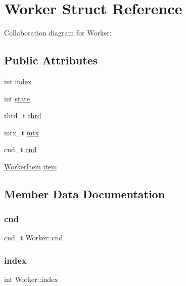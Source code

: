 \hypertarget{structWorker}{}\section{Worker Struct Reference}
\label{structWorker}


Collaboration diagram for Worker\+:
\subsection*{Public Attributes}
\begin{DoxyCompactItemize}
\item 
int \hyperlink{structWorker_a907158fe4322e1a0e2edeb426d85e757}{index}
\item 
int \hyperlink{structWorker_a1003e459fb7686782b33812bc9bbe95c}{state}
\item 
thrd\+\_\+t \hyperlink{structWorker_aadc19b994d770006cb5303fa46a257f8}{thrd}
\item 
mtx\+\_\+t \hyperlink{structWorker_a94f77d872408098dc5ff3d6380161c96}{mtx}
\item 
cnd\+\_\+t \hyperlink{structWorker_a9306d902e2a9177739345af14a3c4301}{cnd}
\item 
\hyperlink{structWorkerItem}{Worker\+Item} \hyperlink{structWorker_a5543b8205b70f14eaf07a15bd255580a}{item}
\end{DoxyCompactItemize}


\subsection{Member Data Documentation}
\mbox{\label{structWorker_a9306d902e2a9177739345af14a3c4301}} 
\subsubsection{\texorpdfstring{cnd}{cnd}}
{\footnotesize\ttfamily cnd\+\_\+t Worker\+::cnd}

\mbox{\label{structWorker_a907158fe4322e1a0e2edeb426d85e757}} 
\subsubsection{\texorpdfstring{index}{index}}
{\footnotesize\ttfamily int Worker\+::index}

